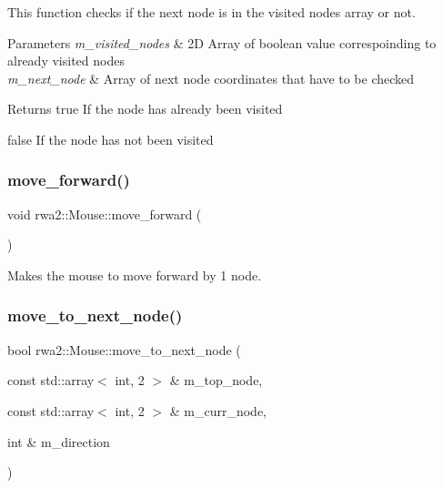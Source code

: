 This function checks if the next node is in the visited nodes array or not. 


\begin{DoxyParams}{Parameters}
{\em m\+\_\+visited\+\_\+nodes} & 2D Array of boolean value correspoinding to already visited nodes \\
\hline
{\em m\+\_\+next\+\_\+node} & Array of next node coordinates that have to be checked \\
\hline
\end{DoxyParams}
\begin{DoxyReturn}{Returns}
true If the node has already been visited 

false If the node has not been visited 
\end{DoxyReturn}
\mbox{\label{classrwa2_1_1_mouse_afc6e0d56e3a777c05efa3929eb256e0a}} 
\subsubsection{\texorpdfstring{move\+\_\+forward()}{move\_forward()}}
{\footnotesize\ttfamily void rwa2\+::\+Mouse\+::move\+\_\+forward (\begin{DoxyParamCaption}{ }\end{DoxyParamCaption})}



Makes the mouse to move forward by 1 node. 

\mbox{\label{classrwa2_1_1_mouse_ab560dba145a772d07698a7b53de2a70b}} 
\subsubsection{\texorpdfstring{move\+\_\+to\+\_\+next\+\_\+node()}{move\_to\_next\_node()}}
{\footnotesize\ttfamily bool rwa2\+::\+Mouse\+::move\+\_\+to\+\_\+next\+\_\+node (\begin{DoxyParamCaption}\item[{const std\+::array$<$ int, 2 $>$ \&}]{m\+\_\+top\+\_\+node,  }\item[{const std\+::array$<$ int, 2 $>$ \&}]{m\+\_\+curr\+\_\+node,  }\item[{int \&}]{m\+\_\+direction }\end{DoxyParamCaption})}



